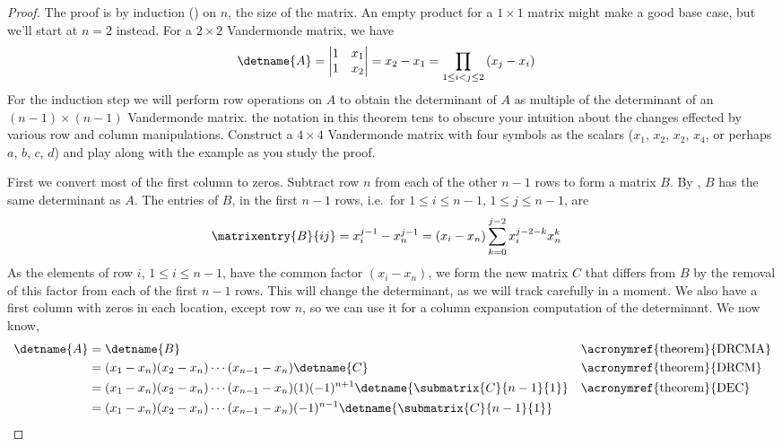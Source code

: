 %
\begin{proof}
The proof is by induction  () on $n$, the size of the matrix. An empty product for a $1\times 1$ matrix might make a good base case, but we'll start at $n=2$ instead.  For a $2\times 2$ Vandermonde matrix, we have 
%
\begin{align*}
\detname{A}
&=
\begin{vmatrix}
1&x_1\\1&x_2
\end{vmatrix}
=x_2-x_1
=\prod_{1\leq i<j\leq 2}\left(x_j-x_i\right)
\end{align*}
%
For the induction step we will perform row operations on $A$ to obtain the determinant of $A$ as multiple of the determinant of an $(n-1)\times(n-1)$ Vandermonde matrix.  the notation in this theorem tens to obscure your intuition about the changes effected by various row and column manipulations.  Construct a $4\times 4$ Vandermonde matrix with four symbols as the scalars ($x_1$, $x_2$, $x_2$, $x_4$, or perhaps $a$, $b$, $c$, $d$) and play along with the example as you study the proof.\par
%
First we convert most of the first column to zeros.  Subtract row $n$ from each of the other $n-1$ rows to form a matrix $B$.  By , $B$ has the same determinant as $A$.  The entries of $B$, in the first $n-1$ rows, i.e.\ for $1\leq i\leq n-1$, $1\leq j\leq n-1$, are
%
\begin{align*}
\matrixentry{B}{ij}
&=x_{i}^{j-1}-x_{n}^{j-1}
=\left(x_i-x_n\right)\sum_{k=0}^{j-2} x_{i}^{j-2-k}x_{n}^{k}
\end{align*}
%
As the elements of row $i$, $1\leq i\leq n-1$, have the common factor $\left(x_i-x_n\right)$, we form the new matrix $C$ that differs from $B$ by the removal of this factor from each of the first $n-1$ rows.  This will change the determinant, as we will track carefully in a moment.  We also have a first column with zeros in each location, except row $n$, so we can use it for a column expansion computation of the determinant.  We now know,
%
\begin{align*}
\detname{A}
&=\detname{B}
&&\text{\acronymref{theorem}{DRCMA}}\\
%
&=(x_1-x_n)(x_2-x_n)\cdots(x_{n-1}-x_n)\detname{C}
&&\text{\acronymref{theorem}{DRCM}}\\
%
&=(x_1-x_n)(x_2-x_n)\cdots(x_{n-1}-x_n)(1)(-1)^{n+1}\detname{\submatrix{C}{n-1}{1}}
&&\text{\acronymref{theorem}{DEC}}\\
%
&=(x_1-x_n)(x_2-x_n)\cdots(x_{n-1}-x_n)(-1)^{n-1}\detname{\submatrix{C}{n-1}{1}}\\

\end{align*}
\end{proof}

